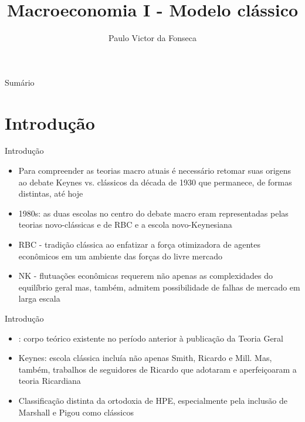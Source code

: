 \documentclass[10pt]{beamer}
\title[]{Macroeconomia I - Modelo clássico}
\author[]{Paulo Victor da Fonseca}
\date{}
\begin{document}
\begin{frame}[plain]
\end{frame}

\begin{frame}{Sumário}
    \tableofcontents
\end{frame}

\section{Introdução}
\begin{frame}{Introdução}
    \begin{itemize}
        \item Para compreender as teorias macro atuais é necessário retomar suas origens ao debate Keynes vs. clássicos da década de 1930 que permanece, de formas distintas, até hoje\bigskip

        \item 1980s: as duas escolas no centro do debate macro eram representadas pelas teorias novo-clássicas e de RBC e a escola novo-Keynesiana\bigskip

        \item RBC - tradição clássica ao enfatizar a força otimizadora de agentes econômicos em um ambiente das forças do livre mercado\bigskip

        \item NK - flutuações econômicas requerem não apenas as complexidades do equilíbrio geral mas, também, admitem possibilidade de falhas de mercado em larga escala
    \end{itemize}
\end{frame}

\begin{frame}{Introdução}
    \begin{itemize}
        \item {}: corpo teórico existente no período anterior à publicação da Teoria Geral\bigskip

        \item Keynes: escola clássica incluía não apenas Smith, Ricardo e Mill. Mas, também, trabalhos de seguidores de Ricardo que adotaram e aperfeiçoaram a teoria Ricardiana\bigskip

        \item Classificação distinta da ortodoxia de HPE, especialmente pela inclusão de Marshall e Pigou como clássicos
    \end{itemize}
\end{frame}
\end{document}
